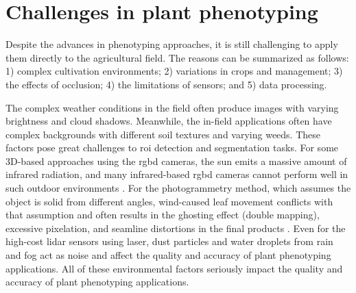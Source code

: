 
\section{Challenges in plant phenotyping}

Despite the advances in phenotyping approaches, it is still challenging to apply them directly to the agricultural field. The reasons can be summarized as follows: 1) complex cultivation environments; 2) variations in crops and management; 3) the effects of occlusion; 4) the limitations of sensors; and 5) data processing.

The complex weather conditions in the field often produce images with varying brightness and cloud shadows. Meanwhile, the in-field applications often have complex backgrounds with different soil textures and varying weeds. These factors pose great challenges to \gls{roi} detection and segmentation tasks. For some 3D-based approaches using the \gls{rgbd} cameras, the sun emits a massive amount of infrared radiation, and many infrared-based \gls{rgbd} cameras cannot perform well in such outdoor environments \citep{tolgyessy_evaluation_2021}. For the photogrammetry method, which assumes the object is solid from different angles, wind-caused leaf movement conflicts with that assumption and often results in the ghosting effect (double mapping), excessive pixelation, and seamline distortions in the final products \citep{duan_comparison_2017,lin_new_2021}. Even for the high-cost \gls{lidar} sensors using laser, dust particles and water droplets from rain and fog act as noise and affect the quality and accuracy of plant phenotyping applications. All of these environmental factors seriously impact the quality and accuracy of plant phenotyping applications.

